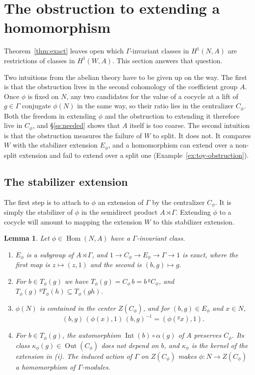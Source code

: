 \documentclass[12pt,letterpaper]{article}
\numberwithin{equation}{section}
\theoremstyle{plain}
\newtheorem{lemma}[theorem]{Lemma}
\theoremstyle{definition}
\newcommand{\act}[2]{{}^{#1}\!#2}          %
\DeclareMathOperator{\Hom}{Hom}
\DeclareMathOperator{\Int}{Int}
\DeclareMathOperator{\Out}{Out}
\begin{document}
\section{The obstruction to extending a homomorphism}\label{sec:obstruction}

Theorem~\ref{thm:exact} leaves open which $\Gamma$-invariant classes in
$H^1(N,A)$ are restrictions of classes in $H^1(W,A)$. This section answers
that question.

Two intuitions from the abelian theory have to be given up on the way.
The first is that the obstruction lives in the second cohomology of the
coefficient group $A$. Once $\phi$ is fixed on $N$, any two candidates
for the value of a cocycle at a lift of $g\in\Gamma$ conjugate $\phi(N)$
in the same way, so their ratio lies in the centralizer $C_\phi$. Both
the freedom in extending $\phi$ and the obstruction to extending it
therefore live in $C_\phi$, and \S\ref{ss:needed} shows that $A$ itself
is too coarse. The second intuition is that the obstruction measures the
failure of $W$ to split. It does not. It compares $W$ with the
stabilizer extension $E_\phi$, and a homomorphism can extend over a
non-split extension and fail to extend over a split one
(Example~\ref{ex:toy-obstruction}).

\subsection{The stabilizer extension}

The first step is to attach to $\phi$ an extension of $\Gamma$ by the
centralizer $C_\phi$. It is simply the stabilizer of $\phi$ in the
semidirect product $A\rtimes\Gamma$. Extending $\phi$ to a cocycle will
amount to mapping the extension $W$ to this stabilizer extension.

\begin{lemma}\label{lem:T}
Let $\phi\in\Hom(N,A)$ have a $\Gamma$-invariant class.
\begin{enumerate}[label=\textup{(\roman*)},itemsep=1pt]
\item $E_\phi$ is a subgroup of $A\rtimes\Gamma$, and
$1\to C_\phi\to E_\phi\to\Gamma\to1$ is exact, where the first map is
$z\mapsto(z,1)$ and the second is $(b,g)\mapsto g$.
\item For $b\in T_\phi(g)$ we have
$T_\phi(g)=C_\phi\,b=b\,\act{g}{C_\phi}$, and
$T_\phi(g)\,\act{g}{T_\phi(h)}\subseteq T_\phi(gh)$.
\item $\phi(N)$ is contained in the center $Z(C_\phi)$, and for
$(b,g)\in E_\phi$ and $x\in N$,
\begin{equation}\label{eq:conjphi}
(b,g)\,(\phi(x),1)\,(b,g)^{-1}=(\phi(\act{g}{x}),1).
\end{equation}
\item For $b\in T_\phi(g)$, the automorphism $\Int(b)\circ\alpha(g)$ of $A$
preserves $C_\phi$. Its class $\kappa_\phi(g)\in\Out(C_\phi)$ does not
depend on $b$, and $\kappa_\phi$ is the kernel of the extension in
\textup{(i)}. The induced action of $\Gamma$ on $Z(C_\phi)$ makes
$\phi:N\to Z(C_\phi)$ a homomorphism of $\Gamma$-modules.
\end{enumerate}
\end{lemma}
\end{document}
